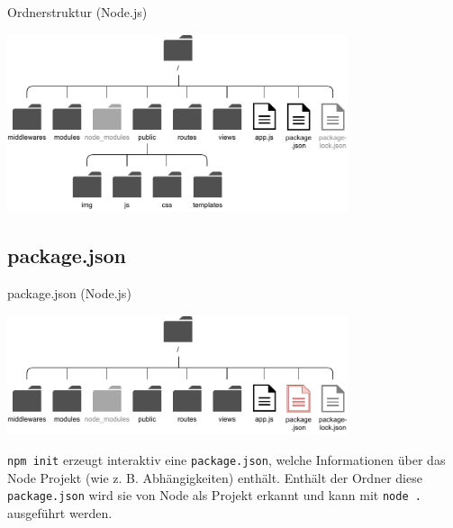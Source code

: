 \begin{example}{Ordnerstruktur (Node.js)}
    \begin{center}
        \includegraphics[width=0.75\textwidth]{includes/figures/example_nodejs_ordnerstruktur.pdf}
    \end{center}
\end{example}

\subsection{package.json}

\begin{bonus}{package.json (Node.js)}
    \begin{center}
        \includegraphics[width=0.75\textwidth]{includes/figures/bonus_nodejs_package.pdf}
    \end{center}

    \texttt{npm init} erzeugt interaktiv eine \texttt{package.json}, welche Informationen über das Node Projekt (wie z. B. Abhängigkeiten) enthält.
    Enthält der Ordner diese \texttt{package.json} wird sie von Node als Projekt erkannt und kann mit \texttt{node .} ausgeführt werden.
\end{bonus}

